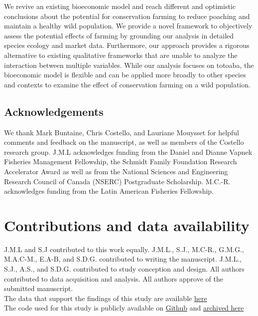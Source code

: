 We revive an existing bioeconomic model and reach different and optimistic conclusions about the potential for conservation farming to reduce poaching and maintain a healthy wild population. We provide a novel framework to objectively assess the potential effects of farming by grounding our analysis in detailed species ecology and market data. Furthermore, our approach provides a rigorous alternative to existing qualitative frameworks that are unable to analyze the interaction between multiple variables. While our analysis focuses on totoaba, the bioeconomic model is flexible and can be applied more broadly to other species and contexts to examine the effect of conservation farming on a wild population. 



\subsection*{Acknowledgements}
We thank Mark Buntaine, Chris Costello, and Lauriane Mouysset for helpful comments and feedback on the manuscript, as well as members of the Costello research group. J.M.L acknowledges funding from the Daniel and Dianne Vapnek Fisheries Management Fellowship, the Schmidt Family Foundation Research Accelerator Award as well as from the National Sciences and Engineering Research Council of Canada (NSERC) Postgraduate Scholarship. M.C.-R. acknowledges funding from the Latin American Fisheries Fellowship. 

\section*{Contributions and data availability}

J.M.L and S.J contributed to this work equally. J.M.L., S.J., M.C-R., G.M.G., M.A.C-M., E.A-B, and S.D.G. contributed to writing the manuscript. J.M.L., S.J., A.S., and S.D.G. contributed to study conception and design. All authors contributed to data acquisition and analysis. All authors approve of the submitted manuscript.
\\
The data that support the findings of this study are available  \href{https://doi.org/10.17605/OSF.IO/6Y8CQ}{here}
\\
The code used for this study is publicly available on \href{https://github.com/julawson/conservation_farming_totoaba}{Github} and \href{https://doi.org/10.17605/OSF.IO/6Y8CQ}{archived here}


